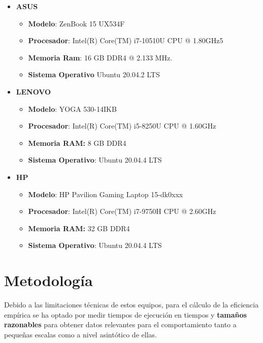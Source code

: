 \documentclass{homework}
\begin{document}
    \begin{itemize}
        \item \textbf{ASUS} 
        \begin{itemize}
            \item \textbf{Modelo}: ZenBook 15 UX534F
            \item \textbf{Procesador}: Intel(R) Core(TM) i7-10510U CPU @ 1.80GHz5
            \item \textbf{Memoria Ram}: 16 GB DDR4 @ 2.133 MHz.
            \item \textbf{Sistema Operativo} Ubuntu 20.04.2 LTS
        \end{itemize}
        
        \item \textbf{LENOVO}
        \begin{itemize}
            \item \textbf{Modelo}: YOGA 530-14IKB
            \item \textbf{Procesador}: Intel(R) Core(TM) i5-8250U CPU @ 1.60GHz
            \item \textbf{Memoria RAM:} 8 GB DDR4
            \item \textbf{Sistema Operativo}: Ubuntu 20.04.4 LTS
        \end{itemize}
        
        \item \textbf{HP}
        \begin{itemize}
            \item \textbf{Modelo}: HP Pavilion Gaming Laptop 15-dk0xxx
            \item \textbf{Procesador}: Intel(R) Core(TM) i7-9750H CPU @ 2.60GHz
            \item \textbf{Memoria RAM:} 32 GB DDR4
            \item \textbf{Sistema Operativo}: Ubuntu 20.04.4 LTS
        \end{itemize}
    \end{itemize}
    

    \section{Metodología}

    Debido a las limitaciones técnicas de estos equipos, para el cálculo de la eficiencia empírica se ha 
    optado por medir tiempos de ejecución en tiempos y \textbf{tamaños razonables} para obtener datos relevantes
    para el comportamiento tanto a pequeñas escalas como a nivel asintótico de ellas. 
\end{document}
